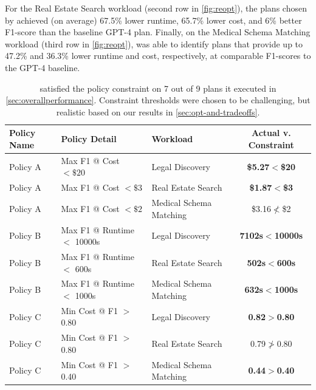 For the Real Estate Search workload (second row in \autoref{fig:reopt}), the plans chosen by \system{} achieved (on average) 67.5\% lower runtime, 65.7\% lower cost, and 6\% better F1-score than the baseline GPT-4 plan. Finally, on the Medical Schema Matching workload (third row in \autoref{fig:reopt}), \system{} was able to identify plans that provide up to 47.2\% and 36.3\% lower runtime and cost, respectively, at comparable F1-scores to the GPT-4 baseline.

\begin{table}
    \centering
    \caption{\system{} satisfied the policy constraint on 7 out of 9 plans it executed in \autoref{sec:overallperformance}. Constraint thresholds were chosen to be challenging, but realistic based on our results in \autoref{sec:opt-and-tradeoffs}.}
    \renewcommand{\arraystretch}{1.3}
    \centering
    \begin{tabular}{|l|l|l|c|}
    \hline
    {\bf Policy Name} &{\bf Policy Detail} & {\bf Workload } & {\bf Actual v. Constraint} \\
    \hline
    Policy A & Max F1 @ Cost $<\$20$ & Legal Discovery & {\bf \$5.27$<$\$20} \\
    \hline
    Policy A & Max F1 @ Cost $<\$3$ & Real Estate Search & {\bf \$1.87$<$\$3} \\
    \hline
    Policy A & Max F1 @ Cost $<\$2$ & Medical Schema Matching & \$3.16$\nless$\$2 \\
    \hline
    Policy B & Max F1 @ Runtime $<$ 10000s & Legal Discovery & {\bf 7102s$<$10000s} \\
    \hline
    Policy B & Max F1 @ Runtime $<$ 600s & Real Estate Search & {\bf 502s$<$600s} \\
    \hline
    Policy B & Max F1 @ Runtime $<$ 1000s & Medical Schema Matching & {\bf 632s$<$1000s} \\
    \hline
    Policy C & Min Cost @ F1 $>$ 0.80 & Legal Discovery & {\bf 0.82$>$0.80} \\
    \hline
    Policy C & Min Cost @ F1 $>$ 0.80 & Real Estate Search & 0.79$\ngtr$0.80 \\
    \hline
    Policy C & Min Cost @ F1 $>$ 0.40 & Medical Schema Matching & {\bf 0.44$>$0.40} \\
    \hline
    \end{tabular}
    \label{tab:policy-results}
\end{table}


